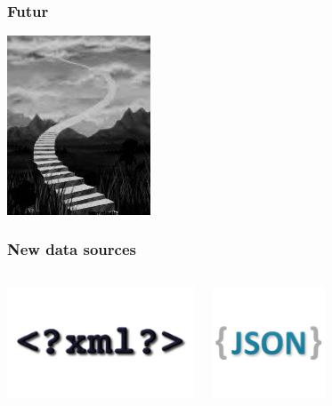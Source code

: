 \documentclass{beamer}
\begin{document}
\begin{frame}
  \frametitle{Futur}

  \begin{center}
    \includegraphics[height=2.1in]{avenir.jpg}
  \end{center}
\end{frame}

\begin{frame}
  \frametitle{New data sources}

  
  \begin{columns}[c]
    \begin{center}
      \includegraphics[height=9em]{xml.png}
    \end{center}
    \begin{center}
      \includegraphics[height=9em]{logo-json.png}
    \end{center}
  \end{columns}
\end{frame}
\end{document}
